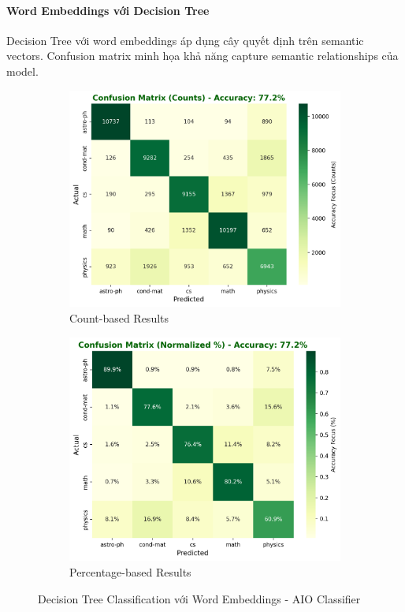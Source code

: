 \paragraph{Word Embeddings với Decision Tree}

Decision Tree với word embeddings áp dụng cây quyết định trên semantic vectors. Confusion matrix minh họa khả năng capture semantic relationships của model.

\begin{figure}[H]
\centering
\begin{subfigure}{0.48\textwidth}
    \centering
    \includegraphics[width=\textwidth]{image/DT_embed_count.png}
    \caption{Count-based Results}
    \label{fig:dt_embed_count_improvements}
\end{subfigure}
\hfill
\begin{subfigure}{0.48\textwidth}
    \centering
    \includegraphics[width=\textwidth]{image/DT_embed_percent.png}
    \caption{Percentage-based Results}
    \label{fig:dt_embed_percent_improvements}
\end{subfigure}
\caption{Decision Tree Classification với Word Embeddings - AIO Classifier}
\label{fig:dt_embed_results_improvements}
\end{figure}

